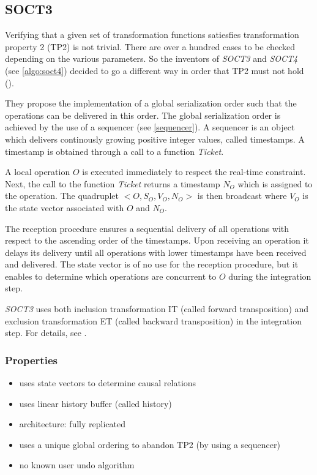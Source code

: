\subsection{SOCT3}
\label{algo:soct3}

Verifying that a given set of transformation functions satiesfies transformation property 2 (TP2) is not trivial. There are over a hundred cases to be checked depending on the various parameters. So the inventors of \emph{SOCT3} and \emph{SOCT4} (see \ref{algo:soct4}) decided to go a different way in order that  TP2 must not hold (\cite{suleiman00}).

They propose the implementation of a global serialization order such that the operations can be delivered in this order. The global serialization order is achieved by the use of a sequencer (see \ref{sequencer}). A sequencer is an object which delivers continously growing positive integer values, called timestamps. A timestamp is obtained through a call to a function \emph{Ticket}.

A local operation $O$ is executed immediately to respect the real-time constraint. Next, the call to the function \emph{Ticket} returns a timestamp $N_{O}$ which is assigned to the operation. The quadruplet $<O,S_{O},V_{O},N_{O}>$ is then broadcast where $V_{O}$ is the state vector associated with $O$ and $N_{O}$.

The reception procedure ensures a sequential delivery of all operations with respect to the ascending order of the timestamps. Upon receiving an operation it delays its delivery until all operations with lower timestamps have been received and delivered. The state vector is of no use for the reception procedure, but it enables to determine which operations are concurrent to $O$ during the integration step.

\emph{SOCT3} uses both inclusion transformation IT (called forward transposition) and exclusion transformation ET (called backward transposition) in the integration step. For details, see \cite{suleiman00}.


\subsubsection{Properties}
\begin{itemize}
 \item uses state vectors to determine causal relations
 \item uses linear history buffer (called history)
 \item architecture: fully replicated
 \item uses a unique global ordering to abandon TP2 (by using a sequencer)
 \item no known user undo algorithm
\end{itemize}
